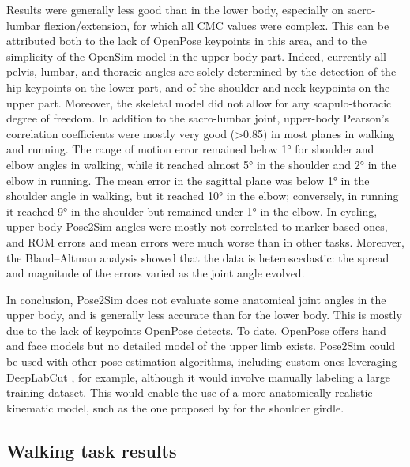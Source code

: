 Results were generally less good than in the lower body, especially on sacro-lumbar flexion/extension, for which all CMC values were complex. This can be attributed both to the lack of OpenPose keypoints in this area, and to the simplicity of the OpenSim model in the upper-body part. Indeed, currently all pelvis, lumbar, and thoracic angles are solely determined by the detection of the hip keypoints on the lower part, and of the shoulder and neck keypoints on the upper part. Moreover, the skeletal model did not allow for any scapulo-thoracic degree of freedom. In addition to the sacro-lumbar joint, upper-body Pearson’s correlation coefficients were mostly very good (>0.85) in most planes in walking and running. The range of motion error remained below 1° for shoulder and elbow angles in walking, while it reached almost 5° in the shoulder and 2° in the elbow in running. The mean error in the sagittal plane was below 1° in the shoulder angle in walking, but it reached 10° in the elbow; conversely, in running it reached 9° in the shoulder but remained under 1° in the elbow. In cycling, upper-body Pose2Sim angles were mostly not correlated to marker-based ones, and ROM errors and mean errors were much worse than in other tasks. Moreover, the Bland–Altman analysis showed that the data is heteroscedastic: the spread and magnitude of the errors varied as the joint angle evolved.

In conclusion, Pose2Sim does not evaluate some anatomical joint angles in the upper body, and is generally less accurate than for the lower body. This is mostly due to the lack of keypoints OpenPose detects. To date, OpenPose offers hand and face models but no detailed model of the upper limb exists. Pose2Sim could be used with other pose estimation algorithms, including custom ones leveraging DeepLabCut \cite{Mathis2018,Lauer2022}, for example, although it would involve manually labeling a large training dataset. This would enable the use of a more anatomically realistic kinematic model, such as the one proposed by \cite{Seth2016} for the shoulder girdle.

\clearpage
\subsection{Walking task results}

